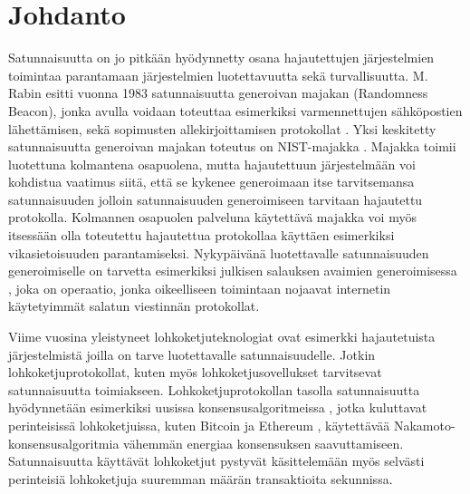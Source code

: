 \chapter{Johdanto\label{intro}}

Satunnaisuutta on jo pitkään hyödynnetty osana hajautettujen järjestelmien toimintaa parantamaan järjestelmien luotettavuutta sekä turvallisuutta. M. Rabin esitti vuonna 1983 satunnaisuutta generoivan majakan (Randomness Beacon), jonka avulla voidaan toteuttaa esimerkiksi varmennettujen sähköpostien lähettämisen, sekä sopimusten allekirjoittamisen protokollat \cite{rabin_transaction_1983}. Yksi keskitetty satunnaisuutta generoivan majakan toteutus on NIST-majakka \cite{computer_security_division_interoperable_2019}. Majakka toimii luotettuna kolmantena osapuolena, mutta hajautettuun järjestelmään voi kohdistua vaatimus siitä, että se kykenee generoimaan itse tarvitsemansa satunnaisuuden jolloin satunnaisuuden generoimiseen tarvitaan hajautettu protokolla. Kolmannen osapuolen palveluna käytettävä majakka voi myös itsessään olla toteutettu hajautettua protokollaa käyttäen esimerkiksi vikasietoisuuden parantamiseksi. Nykypäivänä luotettavalle satunnaisuuden generoimiselle on tarvetta esimerkiksi julkisen salauksen avaimien generoimisessa \cite{corrigan-gibbs_ensuring_2014}, joka on operaatio, jonka oikeelliseen toimintaan nojaavat internetin käytetyimmät salatun viestinnän protokollat. 

Viime vuosina yleistyneet lohkoketjuteknologiat ovat esimerkki hajautetuista järjestelmistä joilla on tarve luotettavalle satunnaisuudelle. Jotkin lohkoketjuprotokollat, kuten myös lohkoketjusovellukset tarvitsevat satunnaisuutta toimiakseen. Lohkoketjuprotokollan tasolla satunnaisuutta hyödynnetään esimerkiksi uusissa konsensusalgoritmeissa \cite{gilad_algorand_2017, hanke_dfinity_2018}, jotka kuluttavat perinteisissä lohkoketjuissa, kuten Bitcoin \cite{noauthor_bitcoin_nodate} ja Ethereum \cite{noauthor_ethereum_nodate}, käytettävää Nakamoto-konsensusalgoritmia vähemmän energiaa konsensuksen saavuttamiseen. Satunnaisuutta käyttävät lohkoketjut pystyvät käsittelemään myös selvästi perinteisiä lohkoketjuja suuremman määrän transaktioita sekunnissa.

